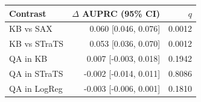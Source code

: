 \begin{tabular}{lrr}
\toprule
Contrast & $\Delta$ AUPRC (95\% CI) & $q$ \\
\midrule
KB vs SAX & 0.060 [0.046, 0.076] & 0.0012 \\
KB vs STraTS & 0.053 [0.036, 0.070] & 0.0012 \\
QA in KB & 0.007 [-0.003, 0.018] & 0.1942 \\
QA in STraTS & -0.002 [-0.014, 0.011] & 0.8086 \\
QA in LogReg & -0.003 [-0.006, 0.001] & 0.1810 \\
\bottomrule
\end{tabular}
